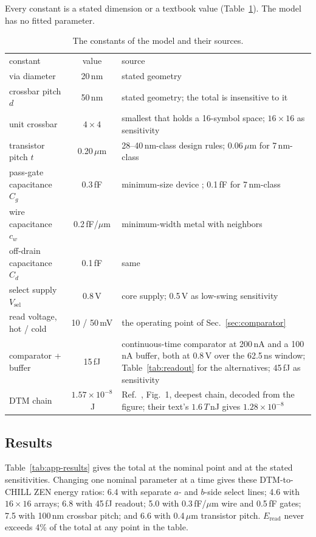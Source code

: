\documentclass[reprint,amsmath,amssymb,aps,nofootinbib]{revtex4-2}
\begin{document}
Every constant is a stated dimension or a textbook value
(Table~\ref{tab:app-constants}). The model has no fitted parameter.

\begin{table}
\caption{The constants of the model and their sources.
\label{tab:app-constants}}
\footnotesize
\begin{ruledtabular}
\begin{tabular}{lcp{2.9cm}}
constant & value & source \\
\colrule
via diameter & 20\,nm & stated geometry \\
crossbar pitch $d$ & 50\,nm & stated geometry; the total is insensitive to it \\
unit crossbar & $4 \times 4$ & smallest that holds a 16-symbol space; $16 \times 16$ as sensitivity \\
transistor pitch $t$ & 0.20\,$\mu$m & 28--40\,nm-class design rules; 0.06\,$\mu$m for 7\,nm-class \\
pass-gate capacitance $C_g$ & 0.3\,fF & minimum-size device \cite{weste2011cmos}; 0.1\,fF for 7\,nm-class \\
wire capacitance $c_w$ & 0.2\,fF/$\mu$m & minimum-width metal with neighbors \cite{weste2011cmos} \\
off-drain capacitance $C_d$ & 0.1\,fF & same \\
select supply $V_{\mathrm{sel}}$ & 0.8\,V & core supply; 0.5\,V as low-swing sensitivity \\
read voltage, hot / cold & 10 / 50\,mV & the operating point of Sec.~\ref{sec:comparator} \\
comparator + buffer & 15\,fJ & continuous-time comparator at 200\,nA and a 100\,nA buffer, both at 0.8\,V over the 62.5\,ns window; Table~\ref{tab:readout} for the alternatives; 45\,fJ as sensitivity \\
DTM chain & $1.57 \times 10^{-8}$\,J & Ref.~\cite{jelincic2025dtm}, Fig.~1, deepest chain, decoded from the figure; their text's $1.6\,T$\,nJ gives $1.28 \times 10^{-8}$ \\
\end{tabular}
\end{ruledtabular}
\end{table}

\subsection{Results}\label{app:results}

Table~\ref{tab:app-results} gives the total at the nominal point and at
the stated sensitivities. Changing one nominal parameter at a time gives these DTM-to-CHILL ZEN
energy ratios: 6.4 with separate $a$- and $b$-side select lines; 4.6
with $16 \times 16$ arrays; 6.8 with 45\,fJ readout; 5.0 with
0.3\,fF/$\mu$m wire and 0.5\,fF gates; 7.5 with 100\,nm crossbar pitch;
and 6.6 with 0.4\,$\mu$m transistor pitch. $E_{\mathrm{read}}$ never exceeds 4\% of the total at
any point in the table.
\end{document}
